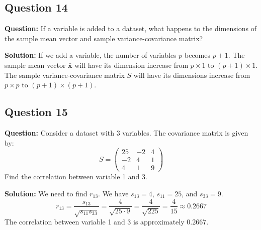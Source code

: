 \subsection*{Question 14}
\textbf{Question:} If a variable is added to a dataset, what happens to the dimensions of the sample mean vector and sample variance-covariance matrix?

\textbf{Solution:}
If we add a variable, the number of variables $p$ becomes $p+1$.
The sample mean vector $\bar{\mathbf{x}}$ will have its dimension increase from $p \times 1$ to $(p+1) \times 1$.
The sample variance-covariance matrix $S$ will have its dimensions increase from $p \times p$ to $(p+1) \times (p+1)$.

\subsection*{Question 15}
\textbf{Question:} Consider a dataset with 3 variables. The covariance matrix is given by:
$$ S = \begin{pmatrix} 25 & -2 & 4 \\ -2 & 4 & 1 \\ 4 & 1 & 9 \end{pmatrix} $$
Find the correlation between variable 1 and 3.

\textbf{Solution:}
We need to find $r_{13}$. We have $s_{13}=4$, $s_{11}=25$, and $s_{33}=9$.
$$ r_{13} = \frac{s_{13}}{\sqrt{s_{11}s_{33}}} = \frac{4}{\sqrt{25 \cdot 9}} = \frac{4}{\sqrt{225}} = \frac{4}{15} \approx 0.2667 $$
The correlation between variable 1 and 3 is approximately 0.2667.
